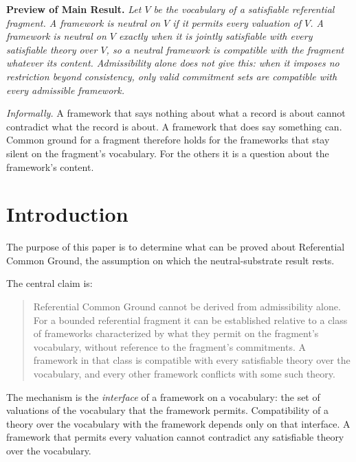 \documentclass[11pt]{article}
\theoremstyle{plain}
\theoremstyle{definition}
\theoremstyle{remark}
\begin{document}

\bigskip
\noindent\textbf{Preview of Main Result.}
\emph{
  Let $V$ be the vocabulary of a satisfiable referential fragment.
  A framework is neutral on $V$ if it permits every valuation of $V$.
  A framework is neutral on $V$ exactly when it is jointly satisfiable with
  every satisfiable theory over $V$, so a neutral framework is compatible with
  the fragment whatever its content.
  Admissibility alone does not give this: when it imposes no restriction beyond
  consistency, only valid commitment sets are compatible with every admissible
  framework.
}

\medskip
\noindent
\emph{Informally.} A framework that says nothing about what a record is about
cannot contradict what the record is about.
A framework that does say something can.
Common ground for a fragment therefore holds for the frameworks that stay
silent on the fragment's vocabulary.
For the others it is a question about the framework's content.

\section{Introduction}
\label{sec:introduction}


The purpose of this paper is to determine what can be proved about Referential
Common Ground, the assumption on which the neutral-substrate result
\citep{case2026neutral} rests.

The central claim is:

\begin{quote}
  Referential Common Ground cannot be derived from admissibility alone.
  For a bounded referential fragment it can be established relative to a class
  of frameworks characterized by what they permit on the fragment's
  vocabulary, without reference to the fragment's commitments.
  A framework in that class is compatible with every satisfiable theory over
  the vocabulary, and every other framework conflicts with some such theory.
\end{quote}

The mechanism is the \emph{interface} of a framework on a vocabulary: the set of
valuations of the vocabulary that the framework permits.
Compatibility of a theory over the vocabulary with the framework depends only
on that interface.
A framework that permits every valuation cannot contradict any satisfiable
theory over the vocabulary.
\end{document}
